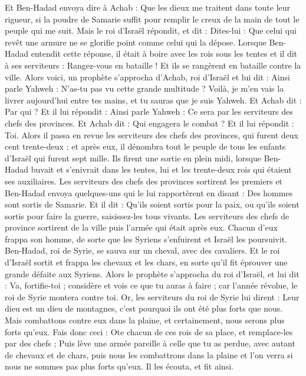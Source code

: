 \begin{multicols}{2}
Et Ben-Hadad envoya dire à Achab : Que les dieux me traitent dans toute leur rigueur, si la poudre de Samarie suffit pour remplir le creux de la main de tout le peuple qui me suit.
Mais le roi d'Israël répondit, et dit : Dites-lui : Que celui qui revêt une armure ne se glorifie point comme celui qui la dépose.
Lorsque Ben-Hadad entendit cette réponse, il était à boire avec les rois sous les tentes et il dit à ses serviteurs : Rangez-vous en bataille ! Et ils se rangèrent en bataille contre la ville.
Alors voici, un prophète s’approcha d’Achab, roi d'Israël et lui dit : Ainsi parle Yahweh : N'as-tu pas vu cette grande multitude ? Voilà, je m'en vais la livrer aujourd'hui entre tes mains, et tu sauras que je suis Yahweh.
Et Achab dit : Par qui ? Et il lui répondit : Ainsi parle Yahweh : Ce sera par les serviteurs des chefs des provinces. Et Achab dit : Qui engagera le combat ? Et il lui répondit : Toi.
Alors il passa en revue les serviteurs des chefs des provinces, qui furent deux cent trente-deux ; et après eux, il dénombra tout le peuple de tous les enfants d'Israël qui furent sept mille.
Ils firent une sortie en plein midi, lorsque Ben-Hadad buvait et s'enivrait dans les tentes, lui et les trente-deux rois qui étaient ses auxiliaires.
Les serviteurs des chefs des provinces sortirent les premiers et Ben-Hadad envoya quelques-uns qui le lui rapportèrent en disant : Des hommes sont sortis de Samarie.
Et il dit : Qu’ils soient sortis pour la paix, ou qu'ils soient sortis pour faire la guerre, saisissez-les tous vivants.
Les serviteurs des chefs de province sortirent de la ville puis l'armée qui était après eux.
Chacun d'eux frappa son homme, de sorte que les Syriens s'enfuirent et Israël les poursuivit. Ben-Hadad, roi de Syrie, se sauva sur un cheval, avec des cavaliers.
Et le roi d'Israël sortit et frappa les chevaux et les chars, en sorte qu'il fit éprouver une grande défaite aux Syriens.
Alors le prophète s’approcha du roi d'Israël, et lui dit : Va, fortifie-toi ; considère et vois ce que tu auras à faire ; car l’année révolue, le roi de Syrie montera contre toi.
Or, les serviteurs du roi de Syrie lui dirent : Leur dieu est un dieu de montagnes, c'est pourquoi ils ont été plus forts que nous. Mais combattons contre eux dans la plaine, et certainement, nous serons plus forts qu'eux.
Fais donc ceci : Ote chacun de ces rois de sa place, et remplace-les par des chefs ;
Puis lève une armée pareille à celle que tu as perdue, avec autant de chevaux et de chars, puis nous les combattrons dans la plaine et l’on verra si nous ne sommes pas plus forts qu'eux. Il les écouta, et fit ainsi.

\end{multicols}
